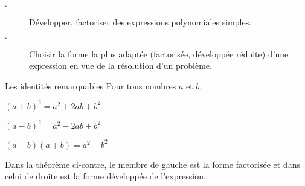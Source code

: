 \begin{titre}

\end{titre}


\begin{CpsCol}
\begin{description}
\item[$\square$] Développer, factoriser des expressions polynomiales simples.
\item[$\square$] Choisir la forme la plus adaptée (factorisée, développée réduite) d’une expression en
vue de la résolution d’un problème.
\end{description}
\end{CpsCol}

\begin{minipage}{0.5\linewidth}
\begin{ThT}{Les identités remarquables}
Pour tous nombres $a$ et $b$, 
\begin{description}
\item $(a+b)^2=a^2+2ab+b^2$
\item $(a-b)^2=a^2-2ab+b^2$
\item $(a-b)(a+b)=a^2-b^2$
\end{description}
\end{ThT}
\end{minipage}
\begin{minipage}{0.5\linewidth}
\begin{Rq}
Dans la théorème ci-contre, le membre de gauche est la forme factorisée et dans celui de droite est la forme développée de l'expression..
\end{Rq}
\end{minipage}





 

 



